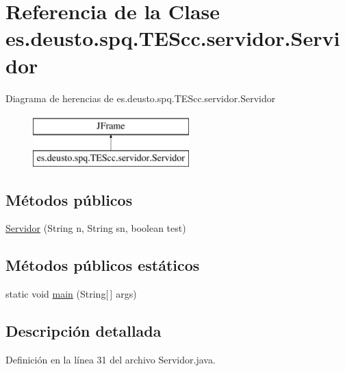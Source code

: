 \hypertarget{classes_1_1deusto_1_1spq_1_1_t_e_scc_1_1servidor_1_1_servidor}{\section{Referencia de la Clase es.\+deusto.\+spq.\+T\+E\+Scc.\+servidor.\+Servidor}
\label{classes_1_1deusto_1_1spq_1_1_t_e_scc_1_1servidor_1_1_servidor}
}
Diagrama de herencias de es.\+deusto.\+spq.\+T\+E\+Scc.\+servidor.\+Servidor\begin{figure}[H]
\begin{center}
\leavevmode
\includegraphics[height=2.000000cm]{classes_1_1deusto_1_1spq_1_1_t_e_scc_1_1servidor_1_1_servidor}
\end{center}
\end{figure}
\subsection*{Métodos públicos}
\begin{DoxyCompactItemize}
\item 
\hyperlink{classes_1_1deusto_1_1spq_1_1_t_e_scc_1_1servidor_1_1_servidor_af99256fabd60a31d22c4fa27f1d96909}{Servidor} (String n, String sn, boolean test)
\end{DoxyCompactItemize}
\subsection*{Métodos públicos estáticos}
\begin{DoxyCompactItemize}
\item 
static void \hyperlink{classes_1_1deusto_1_1spq_1_1_t_e_scc_1_1servidor_1_1_servidor_ad649c5951fc4c399719bdd169d77d6e2}{main} (String\mbox{[}$\,$\mbox{]} args)
\end{DoxyCompactItemize}


\subsection{Descripción detallada}


Definición en la línea 31 del archivo Servidor.\+java.



